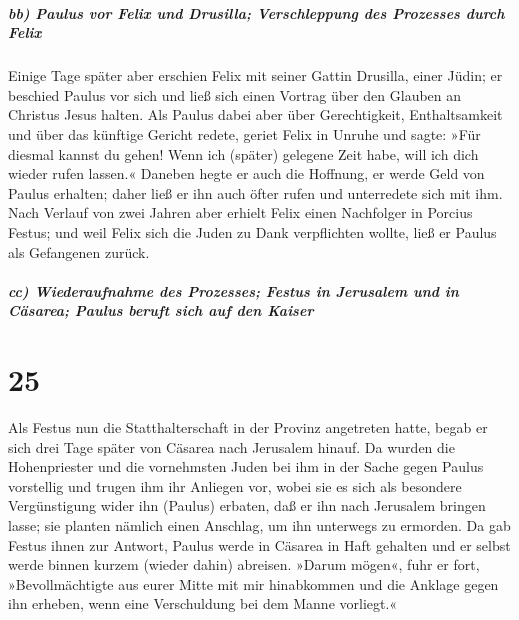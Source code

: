 \hypertarget{bb-paulus-vor-felix-und-drusilla-verschleppung-des-prozesses-durch-felix}{%
\subparagraph{bb) Paulus vor Felix und Drusilla; Verschleppung des
Prozesses durch
Felix}\label{bb-paulus-vor-felix-und-drusilla-verschleppung-des-prozesses-durch-felix}}

 Einige Tage später aber erschien Felix mit seiner Gattin
Drusilla, einer Jüdin; er beschied Paulus vor sich und ließ sich einen
Vortrag über den Glauben an Christus Jesus halten.  Als
Paulus dabei aber über Gerechtigkeit, Enthaltsamkeit und über das
künftige Gericht redete, geriet Felix in Unruhe und sagte: »Für diesmal
kannst du gehen! Wenn ich (später) gelegene Zeit habe, will ich dich
wieder rufen lassen.«  Daneben hegte er auch die
Hoffnung, er werde Geld von Paulus erhalten; daher ließ er ihn auch
öfter rufen und unterredete sich mit ihm.  Nach Verlauf
von zwei Jahren aber erhielt Felix einen Nachfolger in Porcius Festus;
und weil Felix sich die Juden zu Dank verpflichten wollte, ließ er
Paulus als Gefangenen zurück.

\hypertarget{cc-wiederaufnahme-des-prozesses-festus-in-jerusalem-und-in-cuxe4sarea-paulus-beruft-sich-auf-den-kaiser}{%
\subparagraph{cc) Wiederaufnahme des Prozesses; Festus in Jerusalem und
in Cäsarea; Paulus beruft sich auf den
Kaiser}\label{cc-wiederaufnahme-des-prozesses-festus-in-jerusalem-und-in-cuxe4sarea-paulus-beruft-sich-auf-den-kaiser}}

\hypertarget{section-24}{%
\section{25}\label{section-24}}

 Als Festus nun die Statthalterschaft in der Provinz
angetreten hatte, begab er sich drei Tage später von Cäsarea nach
Jerusalem hinauf.  Da wurden die Hohenpriester und die
vornehmsten Juden bei ihm in der Sache gegen Paulus vorstellig und
trugen ihm ihr Anliegen vor,  wobei sie es sich als
besondere Vergünstigung wider ihn (Paulus) erbaten, daß er ihn nach
Jerusalem bringen lasse; sie planten nämlich einen Anschlag, um ihn
unterwegs zu ermorden.  Da gab Festus ihnen zur Antwort,
Paulus werde in Cäsarea in Haft gehalten und er selbst werde binnen
kurzem (wieder dahin) abreisen.  »Darum mögen«, fuhr er
fort, »Bevollmächtigte aus eurer Mitte mit mir hinabkommen und die
Anklage gegen ihn erheben, wenn eine Verschuldung bei dem Manne
vorliegt.«

